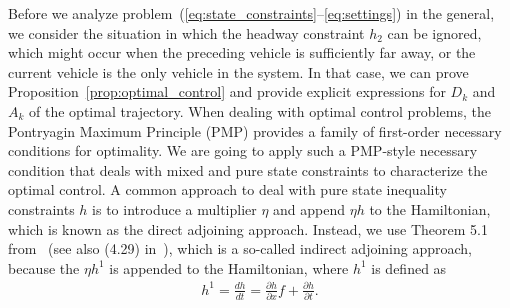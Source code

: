 \documentclass[a4paper]{article}
\theoremstyle{definition}
\theoremstyle{plain}
\begin{document}
Before we analyze problem~(\ref{eq:state_constraints}--\ref{eq:settings}) in the
general, we consider the situation in which the headway constraint $h_{2}$ can
be ignored, which might occur when the preceding vehicle is sufficiently far
away, or the current vehicle is the only vehicle in the system. In that case, we
can prove Proposition~\ref{prop:optimal_control} and provide explicit
expressions for $D_{k}$ and $A_{k}$ of the optimal trajectory.
%
%
When dealing with optimal control problems, the Pontryagin Maximum Principle (PMP) provides a
family of first-order necessary conditions for optimality. We are going to apply
such a PMP-style necessary condition that deals with mixed and pure state
constraints to characterize the optimal control.
%
A common approach to deal with pure state inequality constraints $h$ is to
introduce a multiplier $\eta$ and append $\eta h$ to the Hamiltonian, which is
known as the direct adjoining approach. Instead, we use Theorem 5.1
from~\cite{hartlSurveyMaximumPrinciples1995} (see also (4.29)
in~\cite{sethiOptimalControlTheory2019}), which is a so-called indirect
adjoining approach, because the $\eta h^{1}$ is appended to the Hamiltonian,
where $h^{1}$ is defined as
\begin{align*}
  h^{1} = \frac{dh}{dt} = \frac{\partial h}{\partial x}f + \frac{\partial h}{\partial t} .
\end{align*}
\end{document}
